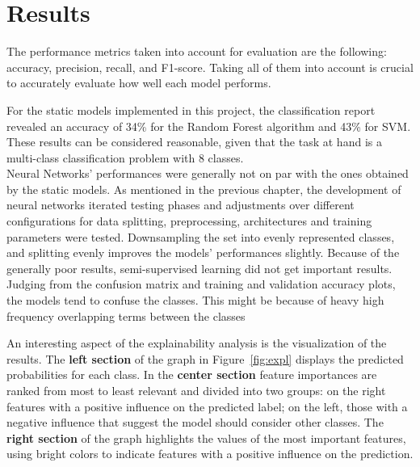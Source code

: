 \chapter*{Results}
\label{ch:results}
The performance metrics taken into account for evaluation are the following:
accuracy, precision, recall, and F1-score. Taking all of them into account
is crucial to accurately evaluate how well each model performs.

For the static models implemented in this project, the classification report
revealed an accuracy of 34\% for the Random Forest algorithm and 43\% for SVM. 
These results can be considered reasonable, given that the task at hand is a
multi-class classification problem with 8 classes.\\

Neural Networks' performances were generally not on par with the ones obtained by
the static models.
As mentioned in the previous chapter, the development of neural networks
iterated testing phases and adjustments over different configurations for data
splitting, preprocessing, architectures and training parameters were tested.
Downsampling the set into evenly represented classes, and splitting evenly
improves the models' performances slightly.
Because of the generally poor results, semi-supervised learning did not get
important results.
Judging from the confusion matrix %
and training and validation accuracy plots, the models tend to confuse the classes.
This might be because of heavy high frequency overlapping terms between the classes


An interesting aspect of the explainability analysis is the visualization of the results.
The \textbf{left section} of the graph in Figure~\ref{fig:expl} displays the predicted probabilities for each class. In the \textbf{center section}
feature importances are ranked from most to least relevant and divided into two groups: on the right
features with a positive influence on the predicted label; on the left, those with a negative influence that suggest the model should consider other classes.
The \textbf{right section} of the graph highlights the values of the most important
features, using bright colors to indicate features with a positive influence on the prediction.

